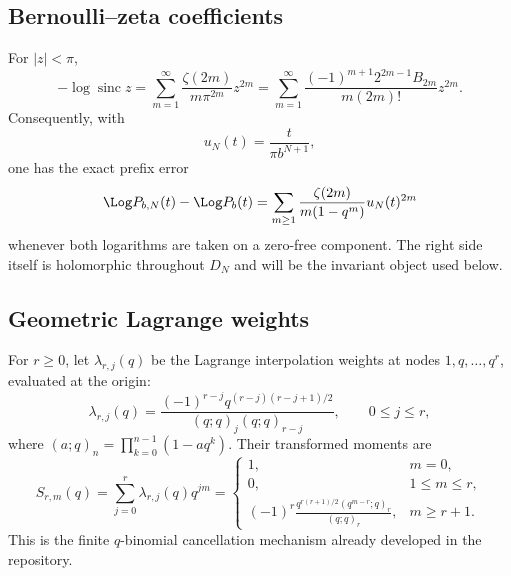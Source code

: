 \documentclass[11pt]{article}
\numberwithin{equation}{section}
\theoremstyle{definition}
\theoremstyle{remark}
\newcommand{\sinc}{\operatorname{sinc}}
\begin{document}
\subsection{Bernoulli--zeta coefficients}

For $|z|<\pi$,
\begin{equation}
 -\log\sinc z
 =\sum_{m=1}^{\infty}\frac{\zeta(2m)}{m\pi^{2m}}z^{2m}
 =\sum_{m=1}^{\infty}
   \frac{(-1)^{m+1}2^{2m-1}B_{2m}}{m(2m)!}z^{2m}.
 \label{p3:eq:log-sinc}
\end{equation}
Consequently, with
\begin{equation}
 u_N(t)=\frac{t}{\pi b^{N+1}},
 \label{p3:eq:uN}
\end{equation}
one has the exact prefix error
\begin{equation}
 \Log P_{b,N}(t)-\Log P_b(t)
 =\sum_{m\ge1}\frac{\zeta(2m)}{m(1-q^m)}u_N(t)^{2m}
 \label{p3:eq:prefix-log-error}
\end{equation}
whenever both logarithms are taken on a zero-free component.  The right side itself is
holomorphic throughout $D_N$ and will be the invariant object used below.

\subsection{Geometric Lagrange weights}

For $r\ge0$, let $\lambda_{r,j}(q)$ be the Lagrange interpolation weights at nodes
$1,q,\ldots,q^r$, evaluated at the origin:
\begin{equation}
 \lambda_{r,j}(q)
 =\frac{(-1)^{r-j}q^{(r-j)(r-j+1)/2}}
       {(q;q)_j(q;q)_{r-j}},
 \qquad 0\le j\le r,
 \label{p3:eq:weights}
\end{equation}
where $(a;q)_n=\prod_{k=0}^{n-1}(1-aq^k)$.  Their transformed moments are
\begin{equation}
 S_{r,m}(q)=\sum_{j=0}^{r}\lambda_{r,j}(q)q^{jm}
 =\begin{cases}
 1,&m=0,\\
 0,&1\le m\le r,\\
 \displaystyle
 (-1)^r\frac{q^{r(r+1)/2}(q^{m-r};q)_r}{(q;q)_r},&m\ge r+1.
 \end{cases}
 \label{p3:eq:transformed-moments}
\end{equation}
This is the finite $q$-binomial cancellation mechanism already developed in the repository.
\end{document}
